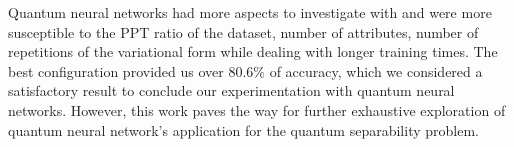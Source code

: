 Quantum neural networks had more aspects to investigate with and were more susceptible to the PPT ratio of the dataset, number of attributes, number of repetitions of the variational form while dealing with longer training times. The best configuration provided us over $80.6\%$ of accuracy, which we considered a satisfactory result to conclude our experimentation with quantum neural networks. However, this work paves the way for further exhaustive exploration of quantum neural network's application for the quantum separability problem.

\endinput
